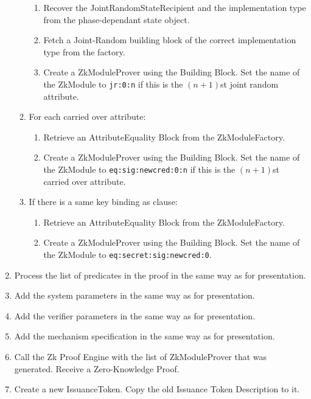 \begin{enumerate}
\begin{enumerate}
            \begin{enumerate}
              \item Recover the JointRandomStateRecipient and the implementation type from the phase-dependant state object.
              \item Fetch a Joint-Random building block of the correct implementation type from the factory.
              \item Create a ZkModuleProver using the Building Block. Set the name of the ZkModule to
                \texttt{jr:0:n} if this is the $(n+1)$st joint random attribute.
            \end{enumerate}
          \item For each carried over attribute:
            \begin{enumerate}
              \item Retrieve an AttributeEquality Block from the ZkModuleFactory.
              \item Create a ZkModuleProver using the Building Block. Set the name of the ZkModule to
                \texttt{eq:sig:newcred:0:n} if this is the $(n+1)$st carried over attribute.
            \end{enumerate}
          \item If there is a same key binding as clause:
            \begin{enumerate}
              \item Retrieve an AttributeEquality Block from the ZkModuleFactory.
              \item Create a ZkModuleProver using the Building Block. Set the name of the ZkModule to
                \texttt{eq:secret:sig:newcred:0}.
            \end{enumerate}
        \end{enumerate}
      \item Process the list of predicates in the proof in the same way as for presentation.
      \item Add the system parameters in the same way as for presentation.
      \item Add the verifier parameters in the same way as for presentation.
      \item Add the mechanism specification in the same way as for presentation.
      \item Call the Zk Proof Engine with the list of ZkModuleProver that was generated. Receive
        a Zero-Knowledge Proof.
      \item Create a new IssuanceToken. Copy the old Issuance Token Description to it.

\end{enumerate}
